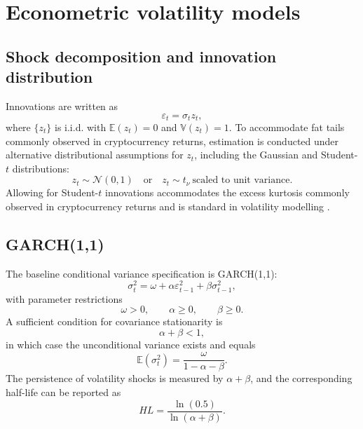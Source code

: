 \documentclass[12pt]{report}
\begin{document}
\section{Econometric volatility models}

\subsection{Shock decomposition and innovation distribution}

Innovations are written as
\begin{equation}
\varepsilon_t = \sigma_t z_t,
\end{equation}
where $\{z_t\}$ is i.i.d. with $\mathbb{E}(z_t)=0$ and $\mathbb{V}(z_t)=1$. To accommodate fat tails commonly observed in cryptocurrency returns, estimation is conducted under alternative distributional assumptions for $z_t$, including the Gaussian and Student-$t$ distributions:
\begin{equation}
z_t \sim \mathcal{N}(0,1)
\quad \text{or} \quad
z_t \sim t_\nu \ \text{scaled to unit variance}.
\end{equation}
Allowing for Student-$t$ innovations accommodates the excess kurtosis commonly observed in cryptocurrency returns and is standard in volatility modelling \citep{hansen1994autoregressive}.

\subsection{GARCH(1,1)}

The baseline conditional variance specification is GARCH(1,1):
\begin{equation}
\sigma_t^2 = \omega + \alpha \varepsilon_{t-1}^2 + \beta \sigma_{t-1}^2,
\end{equation}
with parameter restrictions
\begin{equation}
\omega>0,\qquad \alpha\ge 0,\qquad \beta \ge 0.
\end{equation}
A sufficient condition for covariance stationarity is
\begin{equation}
\alpha+\beta < 1,
\end{equation}
in which case the unconditional variance exists and equals
\begin{equation}
\mathbb{E}(\sigma_t^2) = \frac{\omega}{1-\alpha-\beta}.
\end{equation}
The persistence of volatility shocks is measured by $\alpha+\beta$, and the corresponding half-life can be reported as
\begin{equation}
HL = \frac{\ln(0.5)}{\ln(\alpha+\beta)}.
\end{equation}
\end{document}
